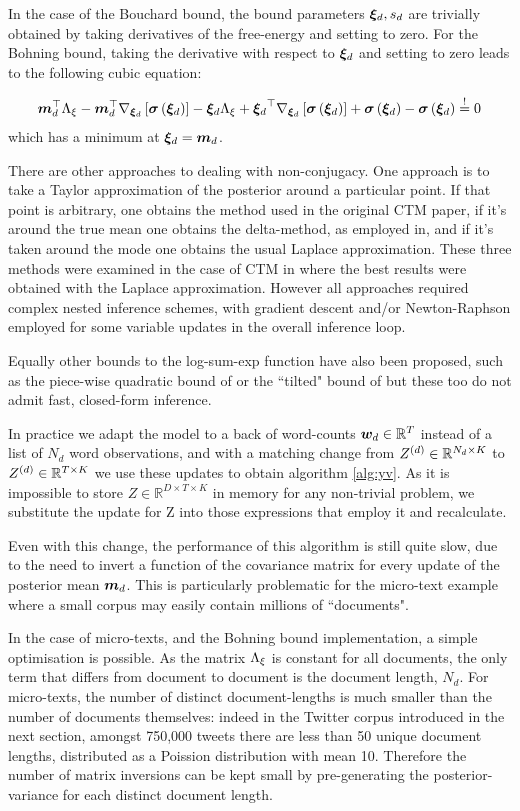 In the case of the Bouchard bound, the bound parameters ${ \bm \xi_d}, s_d$ are trivially obtained by taking derivatives of the free-energy and setting to zero. For the Bohning bound, taking the derivative with respect to ${ \bm \xi_d}$ and setting to zero leads to the following cubic equation:

\begin{align}
\bm m_d^\top { \Lambda_{\xi} }
- \bm m_d^\top{  { \nabla_{{  \bm \xi _d}} } \left[  {  \bm \sigma \left( {  \bm \xi _d}\right) }  \right] }
- { \bm \xi_d} { \Lambda_{\xi} }
+ { \bm \xi_d}^\top{  { \nabla_{{  \bm \xi _d}} } \left[  {  \bm \sigma \left( {  \bm \xi _d}\right) }  \right] }
+ { \bm \sigma\left( { \bm \xi_d} \right) }
- { \bm \sigma\left( { \bm \xi_d} \right) }
\overset{!}{=} 0
\end{align}
which has a minimum at ${ \bm \xi_d} = \bm m_d$.

There are other approaches to dealing with non-conjugacy. One approach is to take a Taylor approximation of the posterior around a particular point. If that point is arbitrary, one obtains the method used in the original CTM paper\cite{Blei2003}, if it's around the true mean one obtains the delta-method, as employed in\cite{Teh2007}, and if it's taken around the mode one obtains the usual Laplace approximation\cite{Bishop2006}. These three methods were examined in the case of CTM in\cite{Wang2013a} where the best results were obtained with the Laplace approximation. However all approaches required complex nested inference schemes, with gradient descent and/or Newton-Raphson employed for some variable updates in the overall inference loop.

Equally other bounds to the log-sum-exp function have also been proposed, such as the piece-wise quadratic bound of \cite{Marlin2011} or the ``tilted" bound of \cite{MinkaKnowles} but these too do not admit fast, closed-form inference.

In practice we adapt the model to a back of word-counts $\bm w_d \in { \mathbb{R}^{T} }$ instead of a list of $N_d$ word observations, and with a matching change from $Z^{(d)} \in { \mathbb{R}^{N_d \times K} }$ to $Z^{(d)} \in { \mathbb{R}^{T \times K} }$ we use these updates to obtain algorithm \ref{alg:yv}. As it is impossible to store $Z \in \mathbb{R}^{D\times T \times K}$ in memory for any non-trivial problem, we substitute the update for Z into those expressions that employ it and recalculate.

Even with this change, the performance of this algorithm is still quite slow, due to the need to invert a function of the covariance matrix for every update of the posterior mean $\bm m_d$. This is particularly problematic for the micro-text example where a small corpus may easily contain millions of ``documents". 

In the case of micro-texts, and the Bohning bound implementation, a simple optimisation is possible. As the matrix ${ \Lambda_{\xi} }$ is constant for all documents, the only term that differs from document to document is the document length, $N_d$. For micro-texts, the number of distinct document-lengths is much smaller than the number of documents themselves: indeed in the Twitter corpus introduced in the next section, amongst 750,000 tweets there are less than 50 unique document lengths, distributed as a Poission distribution with mean 10. Therefore the number of matrix inversions can be kept small by pre-generating the posterior-variance for each distinct document length.

